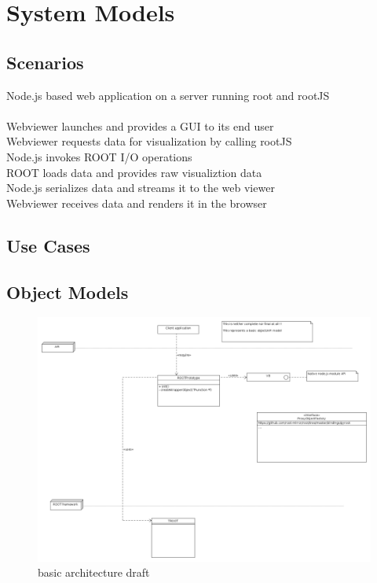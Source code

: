 \chapter{System Models}

\section{Scenarios}
Node.js based web application on a server running root and rootJS\\
\\
Webviewer launches and provides a GUI to its end user	\\
Webviewer requests data for visualization by calling rootJS\\
\indent	Node.js invokes ROOT I/O operations\\
\indent \indent		ROOT loads data and provides raw visualiztion data\\
\indent	Node.js serializes data and streams it to the web viewer\\
Webviewer receives data and renders it in the browser\\
\section{Use Cases}

\pagebreak[4]

\section{Object Models}
\begin{figure}[htb]
	\centering
	\includegraphics[width=18cm]{./latex/resources/architecture.png}
	\caption{basic architecture draft}
\end{figure}

